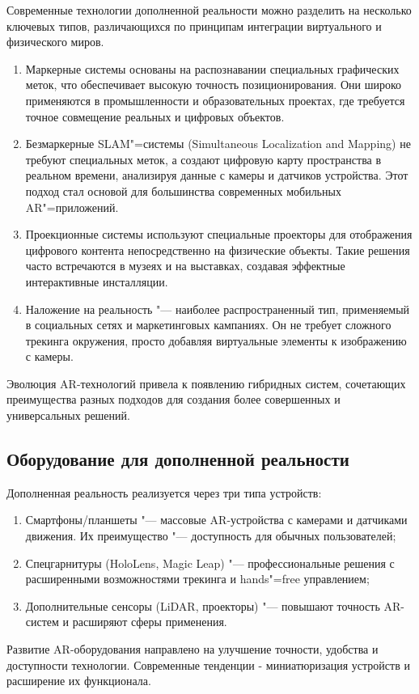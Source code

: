 Современные технологии дополненной реальности можно разделить на несколько ключевых типов, различающихся по принципам интеграции виртуального и физического миров.
\begin{enumerate}
	\item Маркерные системы основаны на распознавании специальных графических меток, что обеспечивает высокую точность позиционирования. Они широко применяются в промышленности и образовательных проектах, где требуется точное совмещение реальных и цифровых объектов.
	\item Безмаркерные SLAM"=системы (Simultaneous Localization and Mapping) не требуют специальных меток, а создают цифровую карту пространства в реальном времени, анализируя данные с камеры и датчиков устройства. Этот подход стал основой для большинства современных мобильных AR"=приложений.
	\item Проекционные системы используют специальные проекторы для отображения цифрового контента непосредственно на физические объекты. Такие решения часто встречаются в музеях и на выставках, создавая эффектные интерактивные инсталляции.
	\item Наложение на реальность "--- наиболее распространенный тип, применяемый в социальных сетях и маркетинговых кампаниях. Он не требует сложного трекинга окружения, просто добавляя виртуальные элементы к изображению с камеры.
\end{enumerate}

Эволюция AR-технологий привела к появлению гибридных систем, сочетающих преимущества разных подходов для создания более совершенных и универсальных решений.

\subsection{Оборудование для дополненной реальности} 

Дополненная реальность реализуется через три типа устройств:
\begin{enumerate}
	\item Смартфоны/планшеты "--- массовые AR-устройства с камерами и датчиками движения. Их преимущество "--- доступность для обычных пользователей;
	\item Спецгарнитуры (HoloLens, Magic Leap) "--- профессиональные решения с расширенными возможностями трекинга и hands"=free управлением;
	\item Дополнительные сенсоры (LiDAR, проекторы) "--- повышают точность AR-систем и расширяют сферы применения.
\end{enumerate}

Развитие AR-оборудования направлено на улучшение точности, удобства и доступности технологии. Современные тенденции - миниатюризация устройств и расширение их функционала.
